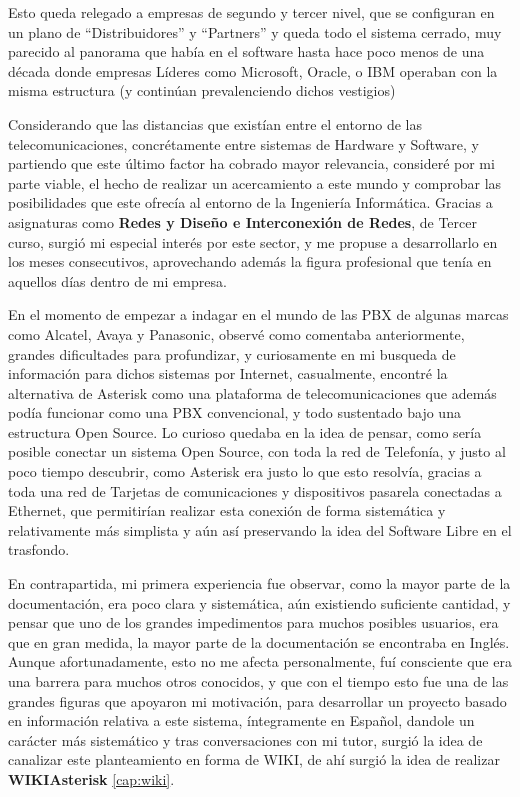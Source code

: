 Esto queda relegado a empresas de segundo y tercer nivel, que se configuran en un plano de ``Distribuidores'' y ``Partners'' y queda todo el sistema cerrado, muy parecido al panorama que había en el software hasta hace poco menos de una década donde empresas Líderes como Microsoft, Oracle, o IBM operaban con la misma estructura (y continúan prevalenciendo dichos vestigios)

Considerando que las distancias que existían entre el entorno de las telecomunicaciones, concrétamente entre sistemas de Hardware y Software, y partiendo que este último factor ha cobrado mayor relevancia, consideré por mi parte viable, el hecho de realizar un acercamiento a este mundo y comprobar las posibilidades que este ofrecía al entorno de la Ingeniería Informática. Gracias a asignaturas como \textbf{Redes y Diseño e Interconexión de Redes}, de Tercer curso, surgió mi especial interés por este sector, y me propuse a desarrollarlo en los meses consecutivos, aprovechando además la figura profesional que tenía en aquellos días dentro de mi empresa.

En el momento de empezar a indagar en el mundo de las PBX de algunas marcas como Alcatel, Avaya y Panasonic, observé como comentaba anteriormente, grandes dificultades para profundizar, y curiosamente en mi busqueda de información para dichos sistemas por Internet, casualmente, encontré la alternativa de Asterisk como una plataforma de telecomunicaciones que además podía funcionar como una PBX convencional, y todo sustentado bajo una estructura Open Source. Lo curioso quedaba en la idea de pensar, como sería posible conectar un sistema Open Source, con toda la red de Telefonía, y justo al poco tiempo descubrir, como Asterisk era justo lo que esto resolvía, gracias a toda una red de Tarjetas de comunicaciones y dispositivos pasarela conectadas a Ethernet, que permitirían realizar esta conexión de forma sistemática y relativamente más simplista y aún así preservando la idea del Software Libre en el trasfondo.

En contrapartida, mi primera experiencia fue observar, como la mayor parte de la documentación, era poco clara y sistemática, aún existiendo suficiente cantidad, y pensar que uno de los grandes impedimentos para muchos posibles usuarios, era que en gran medida, la mayor parte de la documentación se encontraba en Inglés. Aunque afortunadamente, esto no me afecta personalmente, fuí consciente que era una barrera para muchos otros conocidos, y que con el tiempo esto fue una de las grandes figuras que apoyaron mi motivación, para desarrollar un proyecto basado en información relativa a este sistema, íntegramente en Español, dandole un carácter más sistemático y tras conversaciones con mi tutor, surgió la idea de canalizar este planteamiento en forma de WIKI, de ahí surgió la idea de realizar \textbf{WIKIAsterisk} \ref{cap:wiki}.

